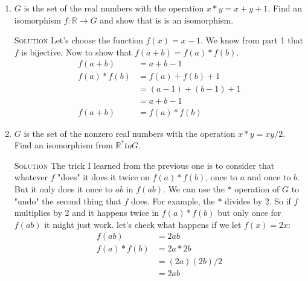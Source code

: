\documentclass[twoside]{amsart}
\newcommand{\Reals}{\ensuremath{\mathbb{R}}\xspace}
\newcommand{\solution}{\textsc{Solution}\xspace}
\newcommand{\blank}{\vspace{5pt}}
\begin{document}
\begin{enumerate}[A.]
\begin{enumerate}[1]
      \blank \noindent \solution The function $f$ is injective.
      Assume $f(a) = f(b)$, then we have $a-1=b-1$, therfore $a=b$.
      It is also surjective. For any $y \in G$ we have $f(x) = y$ for
      $x = y + 1$. (We don't have to worry about finding $x$ if 
      $y = -1$ because $-1 \notin G$. This is fortunate since $0 \notin
      \Reals^*$).

      Now we need to prove the identity $f(ab)=f(a)*f(b)$.
      \setcounter{equation}{0}
      \begin{align}
         f(ab) &= ab - 1 \\
         f(a)*f(b) &= (a-1)*(b-1) \\
                   &= (a-1)+(b-1)+(a-1)(b-1) \\
                   &= a - 1 + b - 1 + ab - a - b + 1\\
                   &= a - a + b - b + ab - 1 - 1 + 1 \\
                   &= ab -1 \\
         f(ab) &= f(a)*f(b)  && \text{From lines 1 and 6}
      \end{align}

      \blank
      \item $G$ is the set of the real numbers with the operation 
      $x * y = x + y + 1$. Find an isomorphism $f : \Reals \to G$ and
      show that is is an isomorphism.

      \blank \noindent \solution Let's choose the function $f(x) = x - 1$.
      We know from part 1 that $f$ is bijective.
      Now to show that $f(a+b) = f(a)*f(b)$.
      \begin{align*}
         f(a+b) &= a + b - 1 \\
         f(a)*f(b) &= f(a) + f(b) + 1 \\
                   &= (a - 1) + (b - 1) + 1 \\
                   &= a + b - 1 \\
          f(a+b) &= f(a)*f(b)
      \end{align*}

      \blank
      \item $G$ is the set of the nonzero real numbers with the operation
      $x*y=xy/2$. Find an isomorphism from $\Reals^* to G$.

      \blank \noindent \solution The trick I learned from the previous
      one is to consider that whatever $f$ "does" it does it twice
      on $f(a)*f(b)$, once to $a$ and once to $b$. But it only does
      it once to $ab$ in $f(ab)$. We can use the $*$ operation of $G$
      to "undo" the second thing that $f$ does. For example, the $*$
      divides by 2. So if $f$ multiplies by 2 and it happens twice in 
      $f(a)*f(b)$ but only once for $f(ab)$ it might just work. let's
      check what happens if we let $f(x) = 2x$:
      \begin{align*}
         f(ab) &= 2ab \\
         f(a)*f(b) &= 2a*2b \\
                   &= (2a)(2b)/2 \\
                   &= 2ab
      \end{align*}


\end{enumerate}
\end{enumerate}
\end{document}
